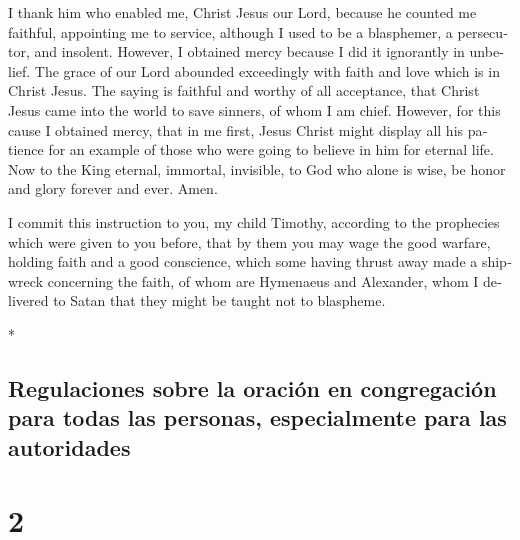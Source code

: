 \begin{paracol}{2}
\begin{otherlanguage}{english}
 I thank him who enabled me, Christ Jesus our Lord,
because he counted me faithful, appointing me to service,
 although I used to be a blasphemer, a persecutor, and
insolent. However, I obtained mercy because I did it ignorantly in
unbelief.  The grace of our Lord abounded exceedingly
with faith and love which is in Christ Jesus.  The saying
is faithful and worthy of all acceptance, that Christ Jesus came into
the world to save sinners, of whom I am chief.  However,
for this cause I obtained mercy, that in me first, Jesus Christ might
display all his patience for an example of those who were going to
believe in him for eternal life.  Now to the King
eternal, immortal, invisible, to God who alone is wise, be honor and
glory forever and ever. Amen.

 I commit this instruction to you, my child Timothy,
according to the prophecies which were given to you before, that by them
you may wage the good warfare,  holding faith and a good
conscience, which some having thrust away made a shipwreck concerning
the faith,  of whom are Hymenaeus and Alexander, whom I
delivered to Satan that they might be taught not to blaspheme.

\end{otherlanguage}

\switchcolumn[0]*

\hypertarget{regulaciones-sobre-la-oraciuxf3n-en-congregaciuxf3n-para-todas-las-personas-especialmente-para-las-autoridades}{%
\subsection{Regulaciones sobre la oración en congregación para todas las
personas, especialmente para las
autoridades}\label{regulaciones-sobre-la-oraciuxf3n-en-congregaciuxf3n-para-todas-las-personas-especialmente-para-las-autoridades}}

\hypertarget{section-2}{%
\section{2}\label{section-2}}


\end{paracol}

